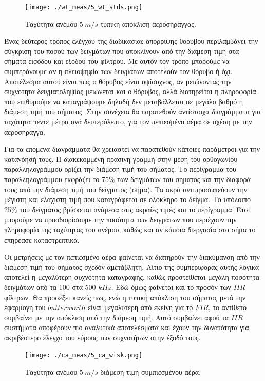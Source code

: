 \documentclass[breaklines=true, 12pt]{article}
\begin{document}
{{{\begin{figure}[t]
\centerline{\texttt{[image: ./wt\_meas/5\_wt\_stds.png]}}
\caption{Ταχύτητα ανέμου \(5\ m/s\) τυπική απόκλιση αεροσήραγγας.}
\label{fig:wt-0-std}
\end{figure}

Ένας δεύτερος τρόπος ελέγχου της διαδικασίας απόρριψης θορύβου περιλαμβάνει
την σύγκριση του ποσού των δειγμάτων που αποκλίνουν από την διάμεση τιμή στα
σήματα εισόδου και εξόδου του φίλτρου. Με αυτόν τον τρόπο μπορούμε να
συμπεράνουμε αν η πλειοψηφία των δειγμάτων αποτελούν τον θόρυβο ή όχι.
Αποτέλεσμα αυτού είναι πως ο θόρυβος είναι υψίσυχνος, αν μειώνοντας την
συχνότητα δειγματοληψίας μειώνεται και ο θόρυβος, αλλά διατηρείται η
πληροφορία που επιθυμούμε να καταγράψουμε δηλαδή δεν μεταβάλλεται σε μεγάλο
βαθμό η διάμεση τιμή του σήματος. Στην συνέχεια θα παρατεθούν αντίστοιχα
διαγράμματα για ταχύτητα πέντε μέτρα ανά δευτερόλεπτο, για τον
πεπιεσμένο αέρα σε σχέση με την αεροσήραγγα.

Για τα επόμενα διαγράμματα θα χρειαστεί να παρατεθούν κάποιες παράμετροι για
την κατανόησή τους. Η διακεκομμένη πράσινη γραμμή στην μέση του ορθογωνίου
παραλληλογράμμου ορίζει την διάμεση τιμή του σήματος. Το περίγραμμα του
παραλληλογράμμου εκφράζει το 75\% των δειγμάτων του σήματος και την διαφορά τους
από την διάμεση τιμή του δείγματος (σήμα). Τα ακρά αντιπροσωπεύουν την
μέγιστη και ελάχιστη τιμή που καταγράφεται σε ολόκληρο το δείγμα. Το υπόλοιπο
25\% του δείγματος βρίσκεται ανάμεσα στις ακραίες τιμές και το περίγραμμα. Έτσι
μπορούμε να προσδιορίσουμε την ποσότητα των δειγμάτων που περιέχουν την
πληροφορία της ταχύτητας του ανέμου, καθώς και αν κάποια διεργασία στο σήμα
το επηρέασε καταστρεπτικά.

Οι μετρήσεις με τον πεπιεσμένο αέρα φαίνεται να διατηρούν την διακύμανση από
την διάμεση τιμή του σήματος σχεδόν αμετάβλητη. Αίτιο της συμπεριφοράς αυτής
λογικά αποτελεί η μεγαλύτερη συχνότητα καταγραφής, καθώς προστείθεται μεγάλη
ποσότητα δειγμάτων από τα 100 στα 500 \(kHz\). Εδώ όμως φαίνεται και το προσόν
των \(IIR\) φίλτρων. Θα προσέξει κανείς πως, ενώ η τυπική απόκλιση του σήματος
μετά την εφαρμογή του \(butterworth\) είναι μεγαλύτερη από εκείνη για το \(FIR\), το
αντίθετο συμβαίνει με την απόκλιση από την διάμεση τιμή. Αυτό συμβαίνει αφού
τα \(IIR\) συστήματα αποφέρουν πιο αναλυτικά αποτελέσματα και έχουν την
δυνατότητα για ακριβέστερο έλεγχο του εύρους των συχνοτήτων στην έξοδό τους.
\begin{figure}[t]
\centerline{\texttt{[image: ./ca\_meas/5\_ca\_wisk.png]}}
\caption{Ταχύτητα ανέμου \(5\ m/s\) διάμεση τιμή συμπιεσμένου αέρα.}
\label{fig:ca-0-mean}
\end{figure}


}}}
\end{document}
